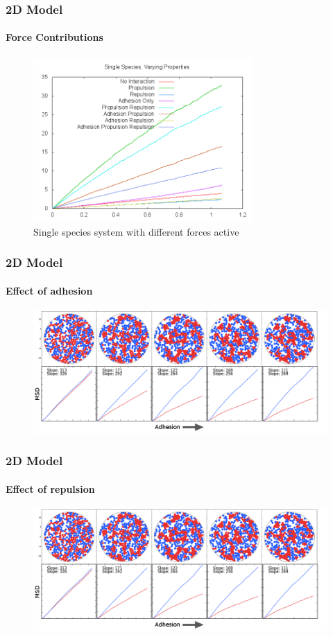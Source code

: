 \documentclass{beamer}
\begin{document}
  \begin{frame}
    \frametitle{2D Model}
    \framesubtitle{Force Contributions}
    \begin{figure}
      \includegraphics[width=3.3in]{msd2D.png}
      \caption{Single species system with different forces active}
    \end{figure}
    \vfill
  \end{frame}

  \begin{frame}
    \frametitle{2D Model}
    \framesubtitle{Effect of adhesion}
    \begin{figure}
      \includegraphics[width=4.5in]{adhesion2d.png}
      \caption{}
    \end{figure}
    \vfill
  \end{frame}

  \begin{frame}
    \frametitle{2D Model}
    \framesubtitle{Effect of repulsion}
    \begin{figure}
      \includegraphics[width=4.5in]{adhesion2d.png}
      \caption{}
    \end{figure}
    \vfill
  \end{frame}
  
\end{document}
